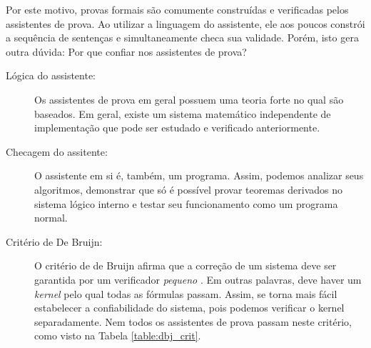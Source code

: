 Por este motivo, provas formais são comumente construídas e verificadas pelos
assistentes de prova. Ao utilizar a linguagem do assistente, ele aos poucos
constrói a sequência de sentenças e simultaneamente checa sua validade. Porém,
isto gera outra dúvida: Por que confiar nos assistentes de prova?


\begin{description}
    \item[Lógica do assistente:] Os assistentes de prova em geral possuem uma
        teoria forte no qual são baseados. Em geral, existe um sistema
        matemático independente de implementação que pode ser estudado e
        verificado anteriormente.
    \item[Checagem do assitente:] O assistente em si é, também, um programa. Assim,
        podemos analizar seus algoritmos, demonstrar que só é possível provar
        teoremas derivados no sistema lógico interno e testar seu funcionamento
        como um programa normal.
    \item[Critério de De Bruijn:] O critério de de Bruijn afirma que a correção
        de um sistema deve ser garantida por um verificador \emph{pequeno}
        \cite{freek}. Em outras palavras, deve haver um \emph{kernel} pelo qual
        todas as fórmulas passam. Assim, se torna mais fácil estabelecer a
        confiabilidade do sistema, pois podemos verificar o kernel
        separadamente. Nem todos os assistentes de prova passam neste critério,
        como visto na Tabela \ref{table:dbj_crit}.
\end{description}

